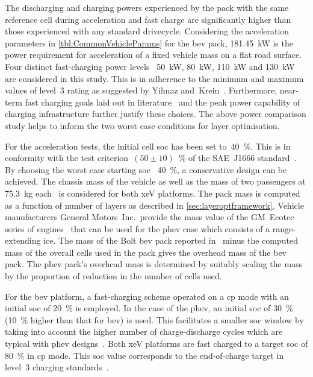 The   discharging  and   charging  powers   experienced  by   the  pack   with
the same reference cell during acceleration and  fast charge  are significantly 
higher than  those experienced with  any  standard  drivecycle.  Considering 
the  acceleration  parameters  in \cref{tbl:CommonVehicleParams} for  the
\gls{bev}  pack, \SI{181.45}{\kilo\watt} is   the  power   requirement  for  
acceleration  of   a  fixed   vehicle  mass on   a   flat  road   surface.  
Four   distinct  fast-charging   power   levels \viz~\SI{50}{\kilo\watt},  
\SI{80}{\kilo\watt},  \SI{110}{\kilo\watt}   and \SI{130}{\kilo\watt}  are
considered  in this  study.  This is  in adherence  to the  minimum  and maximum
values  of  level~3  rating  as suggested  by  Yilmaz
and~Krein~\cite{Yilmaz2012}. Furthermore, near-term fast charging goals laid out
in  literature~\cite{Ashique2017,Srdic2016} and  the  peak  power capability  of
charging infrastructure further justify these choices. The above power
comparison study helps to inform the two worst case conditions for layer
optimisation.



For  the   acceleration  tests,  the   initial  cell  \gls{soc}  has   been  set
to~\SI{40}{\percent}.  This is  in conformity  with the  test criterion~${(50\pm
10)}$~\%  of  the  SAE~J1666  standard~\cite{Sae2010}.  By  choosing  the  worst
case  starting \gls{soc}  \ie~\SI{40}{\percent},  a conservative  design can  be
achieved.  The  chassis  mass  of  the  vehicle as  well  as  the  mass  of  two
passengers at  \SI{75.3}{\kilogram} each~\cite{Sae2010}  is considered  for both
\gls{xeV}  platforms. The  pack mass  is  computed as  a function  of number  of
layers  as  described  in  \cref{sec:layeroptframework}.  Vehicle  manufacturers
General  Motors~Inc.\,  provide  the  mass  value of  the  GM~Ecotec  series  of
engines~\cite{motortrendEcotec} that can  be used for the  \gls{phev} case which
consists of  a range-extending \gls{ice}.  The mass  of the Bolt  \gls{bev} pack
reported in~\cite{ChevyBoltSpecs} minus  the computed mass of  the overall cells
used in the pack  gives the overhead mass of the  \gls{bev} pack. The \gls{phev}
pack's  overhead  mass  is  determined  by suitably  scaling  the  mass  by  the
proportion of reduction in the number of cells used.


For the \gls{bev}  platform, a fast-charging scheme operated on  a \gls{cp} mode
with an initial  \gls{soc} of \SI{20}{\percent} is employed. In  the case of the
\gls{phev}, an initial \gls{soc}  of \SI{30}{\percent} (\SI{10}{\percent} higher
than that for \gls{bev}) is used. This facilitates a smaller \gls{soc} window by
taking  into account  the higher  number  of charge-discharge  cycles which  are
typical with \gls{phev}  designs~\cite{Maksimovic2012}. Both \gls{xeV} platforms
are fast  charged to a target  \gls{soc} of \SI{80}{\percent} in  \gls{cp} mode.
This \gls{soc} value corresponds to the end-of-charge target in level~3 charging
standards~\cite{SAECharging2011}.


